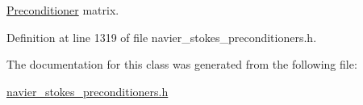 \hyperlink{classoomph_1_1Preconditioner}{Preconditioner} matrix. 



Definition at line 1319 of file navier\+\_\+stokes\+\_\+preconditioners.\+h.



The documentation for this class was generated from the following file\+:\begin{DoxyCompactItemize}
\item 
\hyperlink{navier__stokes__preconditioners_8h}{navier\+\_\+stokes\+\_\+preconditioners.\+h}\end{DoxyCompactItemize}
